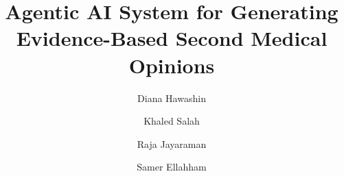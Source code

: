 \documentclass[preprint,12pt]{elsarticle}
\begin{document}
\begin{frontmatter}



\title{Agentic AI System for Generating Evidence-Based Second Medical Opinions}




\author[1]{Diana Hawashin}
\author[1]{Khaled Salah}
\author[2]{Raja Jayaraman}
\author[3]{Samer Ellahham}



\address[1]{Department of Computer and Information Engineering, Khalifa University, Abu Dhabi, UAE}
\address[2]{Department of Industrial Engineering, New Mexico State University, NM, USA}
\address[3]{Heart \& Vascular Institute, Cleveland Clinic Abu Dhabi, Abu Dhabi, UAE}




\end{frontmatter}
\end{document}
